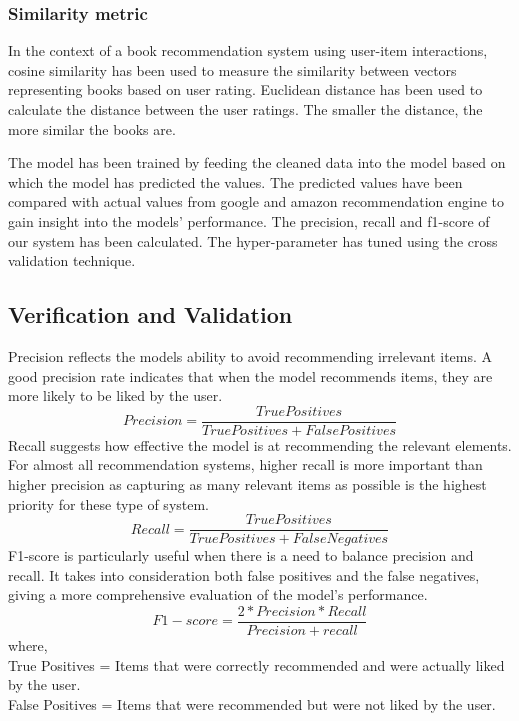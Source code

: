 \subsubsection*{Similarity metric}
   In the context of a book recommendation system using user-item interactions, cosine similarity has been used to measure the similarity between vectors representing books based on user rating.
        Euclidean distance has been used to calculate the distance between the user ratings. The smaller the distance, the more similar the books are.

\par
The model has been trained by feeding the cleaned data into the model based on which the model has predicted the values. The predicted values have been compared with actual values from google and amazon recommendation engine to gain insight into the models' performance. The precision, recall and f1-score of our system has been calculated. The hyper-parameter has tuned using the cross validation technique.

\newpage

\subsection{Verification and Validation}
Precision reflects the models ability to avoid recommending irrelevant items. A good precision rate indicates that when the model recommends items, they are more likely to be liked by the user.
\begin{equation}
\label{precision}
      Precision = \frac{True Positives}{True Positives + False Positives}
\end{equation}
Recall suggests how effective the model is at recommending the relevant elements. For almost all recommendation systems, higher recall is more important than higher precision as capturing as many relevant items as possible is the highest priority for these type of system.
\begin{equation}
\label{recall}
      Recall = \frac{True Positives}{True Positives + False Negatives} 
\end{equation}
F1-score is particularly useful when there is a need to balance precision and recall. It takes into consideration both false positives and the false negatives, giving a more comprehensive evaluation of the model's performance.
\begin{equation}
    \label{f1-score}
          F1-score = \frac{2*Precision*Recall}{Precision + recall} 
\end{equation}
where, \\
True Positives = Items that were correctly recommended and were actually liked by the user. \\
False Positives = Items that were recommended but were not liked by the user.

